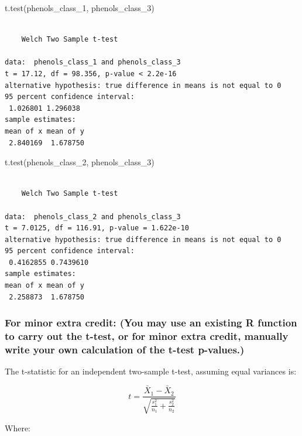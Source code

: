 \documentclass[
  letterpaper,
  DIV=11,
  numbers=noendperiod]{scrartcl}
\newenvironment{Shaded}{\begin{snugshade}}{\end{snugshade}}
\newcommand{\FunctionTok}[1]{\textcolor[rgb]{0.28,0.35,0.67}{#1}}
\newcommand{\NormalTok}[1]{\textcolor[rgb]{0.00,0.23,0.31}{#1}}
\begin{document}
\begin{Shaded}
\begin{Highlighting}[]
\FunctionTok{t.test}\NormalTok{(phenols\_class\_1, phenols\_class\_3)}
\end{Highlighting}
\end{Shaded}

\begin{verbatim}

    Welch Two Sample t-test

data:  phenols_class_1 and phenols_class_3
t = 17.12, df = 98.356, p-value < 2.2e-16
alternative hypothesis: true difference in means is not equal to 0
95 percent confidence interval:
 1.026801 1.296038
sample estimates:
mean of x mean of y 
 2.840169  1.678750 
\end{verbatim}

\begin{Shaded}
\begin{Highlighting}[]
\FunctionTok{t.test}\NormalTok{(phenols\_class\_2, phenols\_class\_3)}
\end{Highlighting}
\end{Shaded}

\begin{verbatim}

    Welch Two Sample t-test

data:  phenols_class_2 and phenols_class_3
t = 7.0125, df = 116.91, p-value = 1.622e-10
alternative hypothesis: true difference in means is not equal to 0
95 percent confidence interval:
 0.4162855 0.7439610
sample estimates:
mean of x mean of y 
 2.258873  1.678750 
\end{verbatim}

\subsubsection{For minor extra credit: (You may use an existing R
function to carry out the t-test, or for minor extra credit, manually
write your own calculation of the t-test
p-values.)}\label{for-minor-extra-credit-you-may-use-an-existing-r-function-to-carry-out-the-t-test-or-for-minor-extra-credit-manually-write-your-own-calculation-of-the-t-test-p-values.}

The t-statistic for an independent two-sample t-test, assuming equal
variances is:

\[
t = \frac{\bar{X}_1 - \bar{X}_2}{\sqrt{\frac{s_1^2}{n_1} + \frac{s_2^2}{n_2}}}
\]

Where:
\end{document}

